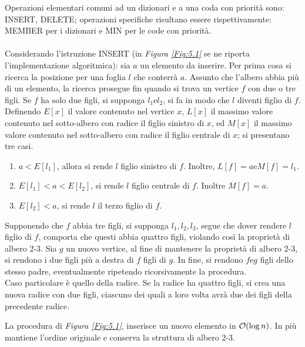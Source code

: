 \documentclass{subfiles}
\begin{document}
Operazioni elementari comuni ad un dizionari e a una coda con priorità sono: INSERT, DELETE; operazioni specifiche risultano essere rispettivamente:
MEMBER per i dizionari e MIN per le code con priorità.
\\ \\
Considerando l'istruzione INSERT (in \emph{Figura \ref{Fig:5.1}} se ne riporta l'implementazione algoritmica): sia \(a\) un elemento da inserire.
Per prima cosa si ricerca la posizione per una foglia \(l\) che conterrà \(a\).
Assunto che l'albero abbia più di un elemento, la ricerca prosegue fin quando si trova un vertice \(f\) con due o tre figli.
Se \(f\) ha solo due figli, si supponga \(l_{1} \text{e} l_{2}\), si fa in modo che \(l\) diventi figlio di \(f\).
\\
Definendo \(E[x]\) il valore contenuto nel vertice \(x\), \(L[x]\) il massimo valore contenuto nel sotto-albero con radice il figlio sinistro di \(x\),
ed \(M[x]\) il massimo valore contenuto nel sotto-albero con radice il figlio centrale di \(x\); si presentano tre casi.
\begin{enumerate}
    \item \(a < E[l_{1}]\), allora si rende \(l\) figlio sinistro di \(f\). Inoltre, \(L[f] = a \text{e} M[f] = l_{1}\).
    \item \(E[l_{1}] < a < E[l_{2}]\), si rende \(l\) figlio centrale di \(f\). Inoltre \(M[f] = a\).
    \item \(E[l_{2}] < a\), si rende \(l\) il terzo figlio di \(f\).
\end{enumerate}

\noindent Supponendo che \(f\) abbia tre figli, si supponga \(l_{1}, l_{2}, l_{3}\), segue che dover rendere \(l\) figlio di \(f\), comporta che questi abbia quattro figli,
violando così la proprietà di albero 2-3. Sia \(g\) un nuovo vertice, al fine di mantenere la proprietà di albero 2-3, si rendono i due figli più a destra di \(f\) figli di \(g\).
In fine, si rendono \(f \text{e} g\) figli dello stesso padre, eventualmente ripetendo ricorsivamente la procedura.
\\
Caso particolare è quello della radice. Se la radice ha quattro figli, si crea una nuova radice con due figli,
ciascuno dei quali a loro volta avrà due dei figli della precedente radice.


\begin{Theorem}
    La procedura di \emph{Figura \ref{Fig:5.1}}, inserisce un nuovo elemento in \(\order{\log n}\). In più mantiene l'ordine originale e conserva la struttura di albero 2-3.
\end{Theorem}
\clearpage
\end{document}
